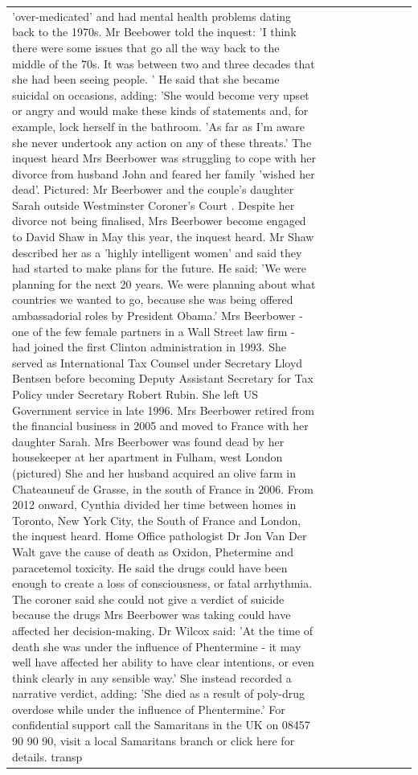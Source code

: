 \begin{table}[H]
\begin{tabular}{lllrlllll}
'over-medicated' and had mental health problems dating back to the 1970s. Mr Beebower told the inquest: 'I think there were some issues that go all the way back to the middle of the 70s. It was between two and three decades that she had been seeing people. ' He said that she became suicidal on occasions, adding: 'She would become very upset or angry and would make these kinds of statements and, for example, lock herself in the bathroom. 'As far as I'm aware she never undertook any action on any of these threats.' The inquest heard Mrs Beerbower was struggling to cope with her divorce from husband John and feared her family 'wished her dead'. Pictured: Mr Beerbower and the couple's daughter Sarah outside Westminster Coroner's Court . Despite her divorce not being finalised, Mrs Beerbower become engaged to David Shaw in May this year, the inquest heard. Mr Shaw described her as a 'highly intelligent women' and said they had started to make plans for the future. He said: 'We were planning for the next 20 years. We were planning about what countries we wanted to go, because she was being offered ambassadorial roles by President Obama.' Mrs Beerbower - one of the few female partners in a Wall Street law firm - had joined the first Clinton administration in 1993. She served as International Tax Counsel under Secretary Lloyd Bentsen before becoming Deputy Assistant Secretary for Tax Policy under Secretary Robert Rubin. She left US Government service in late 1996. Mrs Beerbower retired from the financial business in 2005 and moved to France with her daughter Sarah. Mrs Beerbower was found dead by her housekeeper at her apartment in Fulham, west London (pictured) She and her husband acquired an olive farm in Chateauneuf de Grasse, in the south of France in 2006. From 2012 onward, Cynthia divided her time between homes in Toronto, New York City, the South of France and London, the inquest heard. Home Office pathologist Dr Jon Van Der Walt gave the cause of death as Oxidon, Phetermine and paracetemol toxicity. He said the drugs could have been enough to create a loss of consciousness, or fatal arrhythmia. The coroner said she could not give a verdict of suicide because the drugs Mrs Beerbower was taking could have affected her decision-making. Dr Wilcox said: 'At the time of death she was under the influence of Phentermine - it may well have affected her ability to have clear intentions, or even think clearly in any sensible way.' She instead recorded a narrative verdict, adding: 'She died as a result of poly-drug overdose while under the influence of Phentermine.' For confidential support call the Samaritans in the UK on 08457 90 90 90, visit a local Samaritans branch or click here for details. transp \\

\end{tabular}
\end{table}
